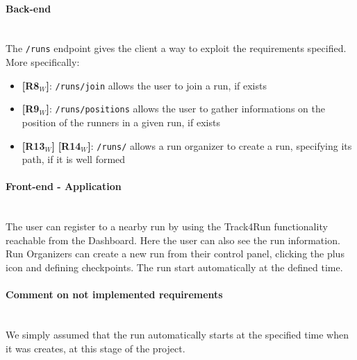 \paragraph{Back-end} \mbox{}\\
The \texttt{/runs} endpoint gives the client a way to exploit the requirements specified.
More specifically: 
\begin{itemize}
    \item \textbf{[R8$_W$]}: \texttt{/runs/join} allows the user to join a run, if exists
    \item \textbf{[R9$_W$]}: \texttt{/runs/positions} allows the user to gather informations on the position of the runners in a given run, if exists
    \item \textbf{[R13$_W$]}  \textbf{[R14$_W$]}: \texttt{/runs/} allows a run organizer to create a run, specifying its path, if it is well formed
\end{itemize}
\paragraph{Front-end - Application} \mbox{}\\
The user can register to a nearby run by using the Track4Run functionality reachable from the Dashboard. Here the user can also see the run information. Run Organizers can create a new run from their control panel, clicking the plus icon and defining checkpoints. The run start automatically at the defined time.

\paragraph{Comment on not implemented requirements} \mbox{}\\ 
We simply assumed that the run automatically starts at the specified time when it was creates, at this stage of the project.

